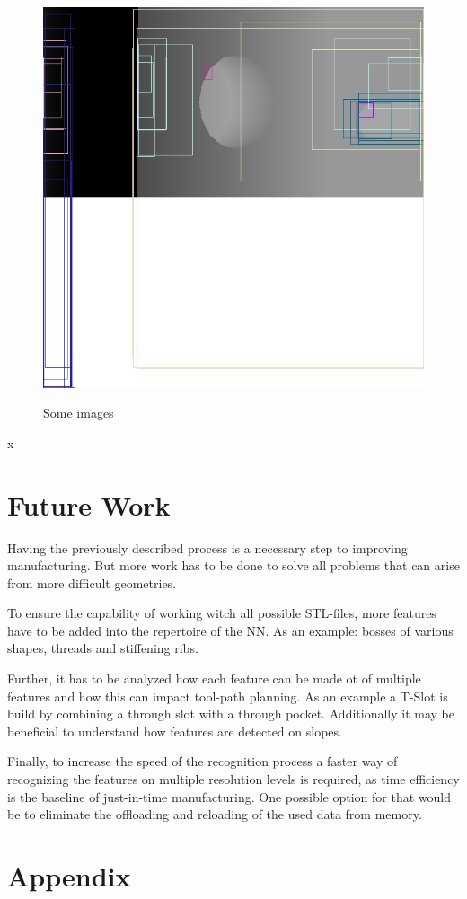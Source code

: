 \documentclass[conference]{IEEEtran}
\begin{document}
\begin{figure}
	\\[\smallskipamount]
	\includegraphics[width=.24\textwidth]{pictures/7.png}\hfill
	\caption{Some images}\label{fig:foobar}
\end{figure}
x
\section{Future Work}
Having the previously described process is a necessary step to improving manufacturing. But more work has to be done to solve all problems that can arise from more difficult geometries. 

To ensure the capability of working witch all possible STL-files, more features have to be added into the repertoire of the NN. As an example: bosses of various shapes, threads and stiffening ribs. 

Further, it has to be analyzed how each feature can be made ot of multiple features and how this can impact tool-path planning. As an example a T-Slot is build by combining a through slot with a through pocket. Additionally it may be beneficial to understand how features are detected on slopes. 

Finally, to increase the speed of the recognition process a faster way of recognizing the features on multiple resolution levels is required, as time efficiency is the baseline of just-in-time manufacturing. One possible option for that would be to eliminate the offloading and reloading of the used data from memory.


\section*{}


\section*{Appendix}
\end{document}
